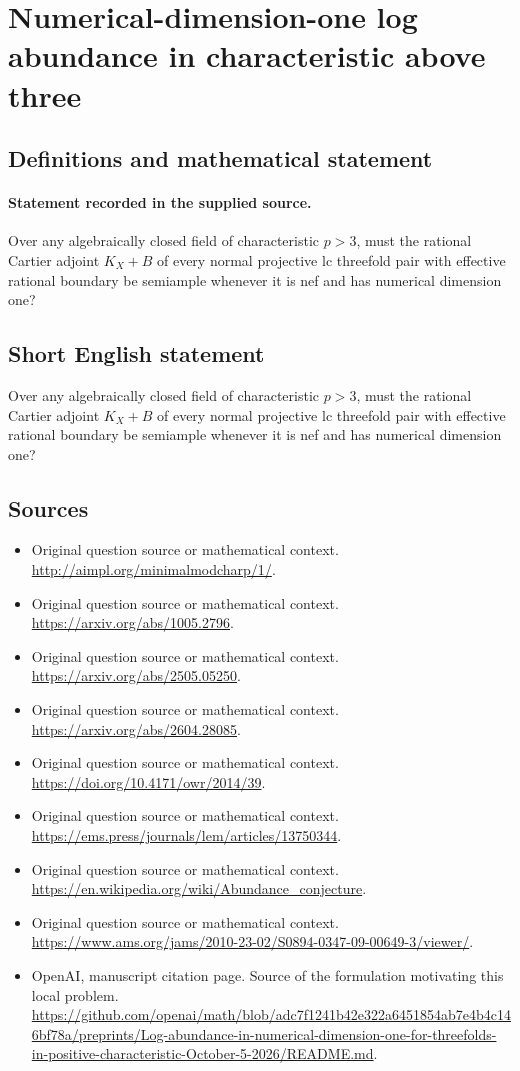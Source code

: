\documentclass[11pt]{article}
\begin{document}
\section*{Numerical-dimension-one log abundance in characteristic above three}\label{30007042}
\subsection{Definitions and mathematical statement}
\paragraph{Statement recorded in the supplied source.}
Over any algebraically closed field of characteristic $p>3$, must the rational Cartier adjoint $K_X+B$ of every normal projective lc threefold pair with effective rational boundary be semiample whenever it is nef and has numerical dimension one?
\subsection{Short English statement}
Over any algebraically closed field of characteristic $p>3$, must the rational Cartier adjoint $K_X+B$ of every normal projective lc threefold pair with effective rational boundary be semiample whenever it is nef and has numerical dimension one?
\subsection{Sources}
\begin{itemize}
\item[S1] Original question source or mathematical context.
\url{http://aimpl.org/minimalmodcharp/1/}.
\item[S2] Original question source or mathematical context.
\url{https://arxiv.org/abs/1005.2796}.
\item[S3] Original question source or mathematical context.
\url{https://arxiv.org/abs/2505.05250}.
\item[S4] Original question source or mathematical context.
\url{https://arxiv.org/abs/2604.28085}.
\item[S5] Original question source or mathematical context.
\url{https://doi.org/10.4171/owr/2014/39}.
\item[S6] Original question source or mathematical context.
\url{https://ems.press/journals/lem/articles/13750344}.
\item[S7] Original question source or mathematical context.
\url{https://en.wikipedia.org/wiki/Abundance_conjecture}.
\item[S8] Original question source or mathematical context.
\url{https://www.ams.org/jams/2010-23-02/S0894-0347-09-00649-3/viewer/}.
\item[S9] OpenAI, manuscript citation page. Source of the formulation motivating this local problem.
\url{https://github.com/openai/math/blob/adc7f1241b42e322a6451854ab7e4b4c146bf78a/preprints/Log-abundance-in-numerical-dimension-one-for-threefolds-in-positive-characteristic-October-5-2026/README.md}.
\end{itemize}
\end{document}

